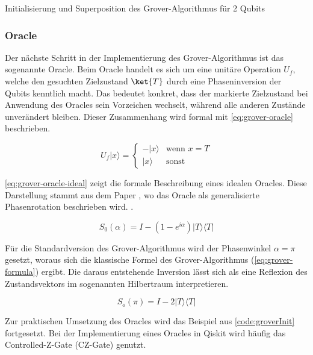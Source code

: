 \begin{listing}[ht!]
  \inputminted{python}{code/quantum-software/grover-init.py}
  \caption{Initialisierung und Superposition des Grover-Algorithmus für 2 Qubits}
  \label{code:groverInit}
\end{listing}

\subsubsection*{Oracle}
Der nächste Schritt in der Implementierung des Grover-Algorithmus ist das sogenannte Oracle. Beim Oracle handelt es sich um eine unitäre Operation $U_f$, welche den gesuchten Zielzustand $\ket{T}$ durch eine Phaseninversion der Qubits kenntlich macht. Das bedeutet konkret, dass der markierte Zielzustand bei Anwendung des Oracles sein Vorzeichen wechselt, während alle anderen Zustände unverändert bleiben. Dieser Zusammenhang wird formal mit \autoref{eq:grover-oracle} beschrieben.

\begin{equation}
\label{eq:grover-oracle}
U_f|x\rangle = \begin{cases}
    -|x\rangle & \text{wenn } x = T \\
    |x\rangle & \text{sonst}
\end{cases}
\end{equation}

\autoref{eq:grover-oracle-ideal} zeigt die formale Beschreibung eines idealen Oracles. Diese Darstellung stammt aus dem Paper , wo das Oracle als generalisierte Phasenrotation beschrieben wird. \autocite[2]{roy_deterministic_2022}.

\begin{equation}
\label{eq:grover-oracle-ideal}
S_0(\alpha) = I - (1 - e^{i\alpha})|T\rangle\langle T|
\end{equation}

Für die Standardversion des Grover-Algorithmus wird der Phasenwinkel $\alpha = \pi$ gesetzt, woraus sich die klassische Formel des Grover-Algorithmus (\autoref{eq:grover-formula}) ergibt. Die daraus entstehende Inversion lässt sich als eine Reflexion des Zustandsvektors im sogenannten Hilbertraum interpretieren. 

\begin{equation}
\label{eq:grover-formula}
S_o(\pi) = I - 2|T\rangle\langle T|
\end{equation}

Zur praktischen Umsetzung des Oracles wird das Beispiel aus \autoref{code:groverInit} fortgesetzt. Bei der Implementierung eines Oracles in Qiskit wird häufig das Controlled-Z-Gate (CZ-Gate) genutzt. 

